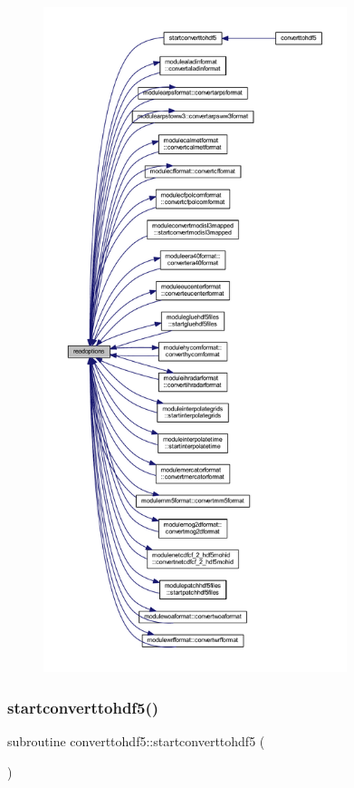 \begin{figure}[H]
\begin{center}
\leavevmode
\includegraphics[height=550pt]{_convert_to_h_d_f5_8_f90_a2233a80cf5c89674ce4f80d91531c0ea_icgraph}
\end{center}
\end{figure}
\mbox{\label{_convert_to_h_d_f5_8_f90_aae05b4c91bf88e26202fcc1b279beddf}} 
\subsubsection{\texorpdfstring{startconverttohdf5()}{startconverttohdf5()}}
{\footnotesize\ttfamily subroutine converttohdf5\+::startconverttohdf5 (\begin{DoxyParamCaption}{ }\end{DoxyParamCaption})}

